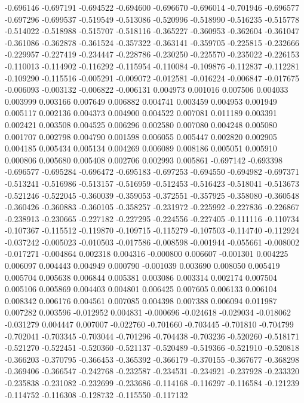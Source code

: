 -0.696146
-0.697191
-0.694522
-0.694600
-0.696670
-0.696014
-0.701946
-0.696577
-0.697296
-0.699537
-0.519549
-0.513086
-0.520996
-0.518990
-0.516235
-0.515778
-0.514022
-0.518988
-0.515707
-0.518116
-0.365227
-0.360953
-0.362604
-0.361047
-0.361086
-0.362878
-0.361524
-0.357322
-0.363141
-0.359705
-0.225815
-0.232666
-0.229957
-0.227419
-0.234447
-0.228786
-0.230250
-0.225570
-0.235022
-0.226153
-0.110013
-0.114902
-0.116292
-0.115954
-0.110084
-0.109876
-0.112837
-0.112281
-0.109290
-0.115516
-0.005291
-0.009072
-0.012581
-0.016224
-0.006847
-0.017675
-0.006093
-0.003132
-0.006822
-0.006131
0.004973
0.001016
0.007506
0.004033
0.003999
0.003166
0.007649
0.006882
0.004741
0.003459
0.004953
0.001949
0.005117
0.002136
0.004373
0.004900
0.004522
0.007081
0.011189
0.003391
0.002421
0.003508
0.004525
0.006296
0.002580
0.007080
0.004248
0.005080
0.001707
0.002798
0.004790
0.001598
0.006055
0.005447
0.002820
0.002905
0.004185
0.005434
0.005134
0.004269
0.006089
0.008186
0.005051
0.005910
0.000806
0.005680
0.005408
0.002706
0.002993
0.005861
-0.697142
-0.693398
-0.696577
-0.695284
-0.696472
-0.695183
-0.697253
-0.694550
-0.694982
-0.697371
-0.513241
-0.516986
-0.513157
-0.516959
-0.512453
-0.516423
-0.518041
-0.513673
-0.521246
-0.522045
-0.360039
-0.359053
-0.372551
-0.357925
-0.358080
-0.360548
-0.360426
-0.360883
-0.360105
-0.358257
-0.231972
-0.225992
-0.227836
-0.226867
-0.238913
-0.230665
-0.227182
-0.227295
-0.224556
-0.227405
-0.111116
-0.110734
-0.107367
-0.115512
-0.119870
-0.109715
-0.115279
-0.107503
-0.114740
-0.112924
-0.037242
-0.005023
-0.010503
-0.017586
-0.008598
-0.001944
-0.055661
-0.008002
-0.017271
-0.004864
0.002318
0.004316
-0.000800
0.006607
-0.001301
0.004225
0.006097
0.004443
0.004949
0.000790
-0.001039
0.003690
0.008050
0.005419
0.005704
0.005638
0.006844
0.005381
0.003086
0.003314
0.002174
0.007504
0.005106
0.005869
0.004403
0.004801
0.006425
0.007605
0.006133
0.006104
0.008342
0.006176
0.004561
0.007085
0.004398
0.007388
0.006094
0.011987
0.007282
0.003596
-0.012952
0.004831
-0.000696
-0.024618
-0.029034
-0.018062
-0.031279
0.004447
0.007007
-0.022760
-0.701660
-0.703445
-0.701810
-0.704799
-0.702041
-0.703345
-0.703044
-0.701296
-0.704438
-0.703236
-0.520260
-0.518171
-0.521270
-0.522451
-0.520360
-0.521137
-0.520489
-0.519366
-0.521910
-0.520818
-0.366203
-0.370795
-0.366453
-0.365392
-0.366179
-0.370155
-0.367677
-0.368298
-0.369406
-0.366547
-0.242768
-0.232587
-0.234531
-0.234921
-0.237928
-0.233320
-0.235838
-0.231082
-0.232699
-0.233686
-0.114168
-0.116297
-0.116584
-0.121239
-0.114752
-0.116308
-0.128732
-0.115550
-0.117132
